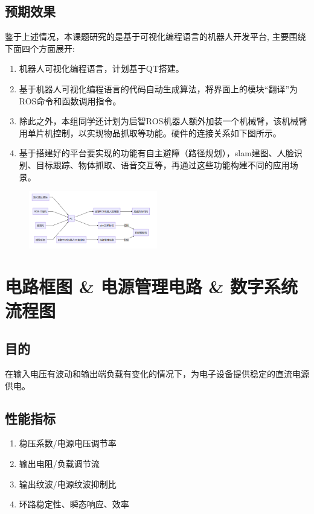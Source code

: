 \documentclass[11pt]{article}
\begin{document}
\subsection{预期效果}
鉴于上述情况，本课题研究的是基于可视化编程语言的机器人开发平台,
主要围绕下面四个方面展开:
\begin{enumerate}
    \item 机器人可视化编程语言，计划基于QT搭建。
    \item 基于机器人可视化编程语言的代码自动生成算法，将界面上的模块``翻译''为ROS命令和函数调用指令。
    \item 除此之外，本组同学还计划为启智ROS机器人额外加装一个机械臂，该机械臂用单片机控制，以实现物品抓取等功能。硬件的连接关系如下图所示。
    \item 基于搭建好的平台要实现的功能有自主避障（路径规划），slam建图、人脸识别、目标跟踪、物体抓取、语音交互等，再通过这些功能构建不同的应用场景。
\end{enumerate}
\begin{figure}[H] %
    \centering %
    \includegraphics[width=0.5\textwidth]{9} %
\end{figure}
\section{电路框图 \& 电源管理电路 \& 数字系统流程图}
\subsection{目的}
在输入电压有波动和输出端负载有变化的情况下，为电子设备提供稳定的直流电源供电。
\subsection{性能指标}
\begin{enumerate}[$\bullet$]
    \item 稳压系数/电源电压调节率
    \item 输出电阻/负载调节流
    \item 输出纹波/电源纹波抑制比
    \item 环路稳定性、瞬态响应、效率
\end{enumerate}
\end{document}
